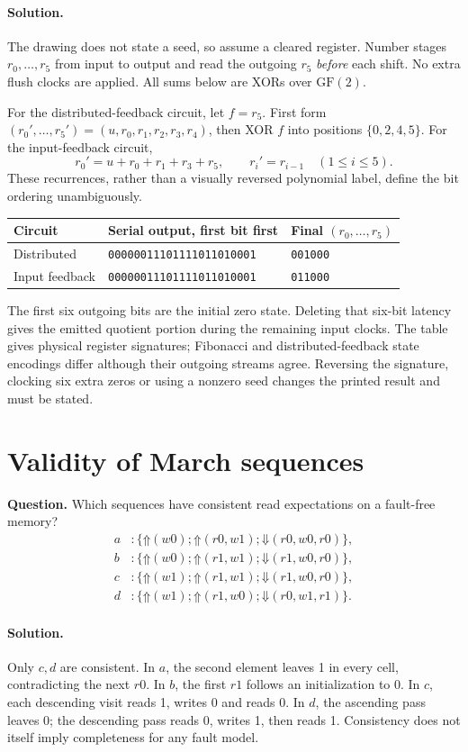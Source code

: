 \documentclass[11pt]{article}
\newcommand{\sol}{\paragraph{Solution.}}
\newcommand{\up}{\mathord{\Uparrow}}
\newcommand{\dn}{\mathord{\Downarrow}}
\begin{document}
\sol The drawing does not state a seed, so assume a cleared register.
Number stages $r_0,\ldots,r_5$ from input to output and read the outgoing
$r_5$ \emph{before} each shift. No extra flush clocks are applied.
All sums below are XORs over $\mathrm{GF}(2)$.

For the distributed-feedback circuit, let $f=r_5$.
First form $(r_0',\ldots,r_5')=(u,r_0,r_1,r_2,r_3,r_4)$,
then XOR $f$ into positions $\{0,2,4,5\}$.
For the input-feedback circuit,
\[
r_0'=u+r_0+r_1+r_3+r_5,\qquad r_i'=r_{i-1}\quad(1\le i\le5).
\]
These recurrences, rather than a visually reversed polynomial label, define
the bit ordering unambiguously.
\begin{center}\begin{tabular}{lll}\toprule
Circuit & Serial output, first bit first & Final $(r_0,\ldots,r_5)$\\\midrule
Distributed & \texttt{00000011101111011010001} & \texttt{001000}\\
Input feedback & \texttt{00000011101111011010001} & \texttt{011000}\\
\bottomrule\end{tabular}\end{center}
The first six outgoing bits are the initial zero state.
Deleting that six-bit latency gives the emitted quotient portion during the
remaining input clocks. The table gives physical register signatures;
Fibonacci and distributed-feedback state encodings differ although their
outgoing streams agree. Reversing the signature, clocking six extra zeros or
using a nonzero seed changes the printed result and must be stated.

\section{Validity of March sequences}
\textbf{Question.} Which sequences have consistent read expectations on a
fault-free memory?
\begin{align*}
a&:\{\up(w0);\up(r0,w1);\dn(r0,w0,r0)\},\\
b&:\{\up(w0);\up(r1,w1);\dn(r1,w0,r0)\},\\
c&:\{\up(w1);\up(r1,w1);\dn(r1,w0,r0)\},\\
d&:\{\up(w1);\up(r1,w0);\dn(r0,w1,r1)\}.
\end{align*}
\sol Only $c,d$ are consistent.
In $a$, the second element leaves 1 in every cell, contradicting the next $r0$.
In $b$, the first $r1$ follows an initialization to 0.
In $c$, each descending visit reads 1, writes 0 and reads 0.
In $d$, the ascending pass leaves 0; the descending pass reads 0, writes 1,
then reads 1. Consistency does not itself imply completeness for any fault model.
\end{document}
